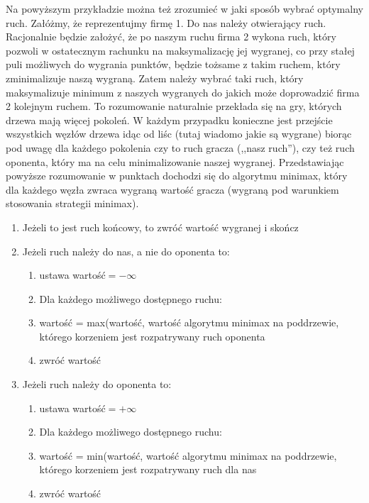 \documentclass[licencjacka]{pracamgr}
\begin{document}
Na powyższym przykładzie można też zrozumieć w jaki sposób wybrać optymalny ruch. Załóżmy, że reprezentujmy firmę 1. Do nas należy otwierający ruch. Racjonalnie będzie założyć, że po naszym ruchu firma 2 wykona ruch, który pozwoli w ostatecznym rachunku na maksymalizację jej wygranej, co przy stałej puli możliwych do wygrania punktów, będzie tożsame z takim ruchem, który zminimalizuje naszą wygraną. Zatem należy wybrać taki ruch, który maksymalizuje minimum z naszych wygranych do jakich może doprowadzić firma 2 kolejnym ruchem.  To rozumowanie naturalnie przekłada się na gry, których drzewa mają więcej pokoleń. W każdym przypadku konieczne jest przejście wszystkich węzłów drzewa idąc od liśc (tutaj wiadomo jakie są wygrane) biorąc pod uwagę dla każdego pokolenia czy to ruch gracza (,,nasz ruch''), czy też ruch oponenta, który ma na celu minimalizowanie naszej wygranej. Przedstawiając powyższe rozumowanie w punktach dochodzi się do algorytmu minimax, który dla każdego węzła zwraca wygraną wartość gracza (wygraną pod warunkiem stosowania strategii minimax). \\

\begin{enumerate}
	\item{Jeżeli to jest ruch końcowy, to zwróć wartość wygranej i skończ}
	\item{Jeżeli ruch należy do nas, a nie do oponenta to:}
	\begin{enumerate}
		\item{ustawa wartość$=-\infty$}
		\item{Dla każdego możliwego dostępnego ruchu: }
		\item{wartość = max(wartość,  wartość algorytmu minimax na poddrzewie, którego korzeniem jest rozpatrywany ruch oponenta}
		\item{zwróć wartość}
	\end{enumerate}
		\item{Jeżeli ruch należy do oponenta to:}
	\begin{enumerate}
		\item{ustawa wartość$=+\infty$}
		\item{Dla każdego możliwego dostępnego ruchu: }
		\item{wartość = min(wartość,  wartość algorytmu minimax na poddrzewie, którego korzeniem jest rozpatrywany ruch dla nas}
		\item{zwróć wartość}
	\end{enumerate}
\end{enumerate}
\end{document}
